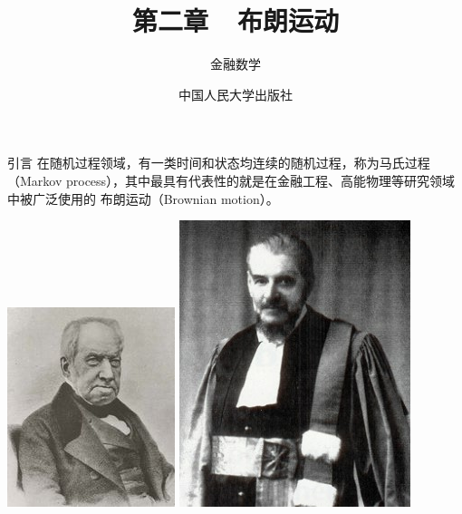 \documentclass[t]{beamer}
\begin{document}
\fontsize{11}{18}\selectfont


\CTEXindent



  \title{第二章~~布朗运动}
\author{金融数学}
\date{中国人民大学出版社}
  \begin{frame}
    \maketitle
  \end{frame}

  \begin{frame}{引言}
    在随机过程领域，有一类时间和状态均连续的随机过程，称为马氏过程（Markov
process），其中最具有代表性的就是在金融工程、高能物理等研究领域中被广泛使用的
布朗运动（Brownian motion）。

    \begin{center}
      \includegraphics[height=.35\textheight]{fig/brown.jpg} 
\includegraphics[height=.35\textheight]{fig/bachelier.jpg}

\end{center}
\end{frame}
\end{document}
